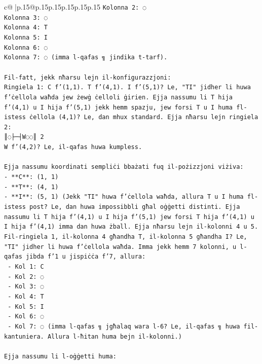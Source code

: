 \documentclass{article}
\begin{document}
{\begin{supertabular}{c@{$\;$}|p{.15\linewidth}@{}p{.15\linewidth}p{.15\linewidth}p{.15\linewidth}p{.15\linewidth}p{.15\linewidth}}
{{{\texttt{Kolonna 2: ◌} \\
\texttt{Kolonna 3: ◌} \\
\texttt{Kolonna 4: T} \\
\texttt{Kolonna 5: I} \\
\texttt{Kolonna 6: ◌} \\
\texttt{Kolonna 7: ◌ (imma l{-}qafas ╗ jindika t{-}tarf).} \\
\\ 
\texttt{Fil{-}fatt, jekk nħarsu lejn il{-}konfigurazzjoni:} \\
\texttt{Ringiela 1: C f'(1,1). T f'(4,1). I f'(5,1)? Le, "TI" jidher li huwa f'ċellola waħda jew żewġ ċelloli ġirien. Ejja nassumu li T hija f'(4,1) u I hija f'(5,1) jekk hemm spazju, jew forsi T u I huma fl{-}istess ċellola (4,1)? Le, dan mhux standard. Ejja nħarsu lejn ringiela 2:} \\
\texttt{║◌├─┤W◌◌║ 2} \\
\texttt{W f'(4,2)? Le, il{-}qafas huwa kumpless.} \\
\\ 
\texttt{Ejja nassumu koordinati sempliċi bbażati fuq il{-}pożizzjoni viżiva:} \\
\texttt{{-} **C**: (1, 1)} \\
\texttt{{-} **T**: (4, 1)} \\
\texttt{{-} **I**: (5, 1) (Jekk "TI" huwa f'ċellola waħda, allura T u I huma fl{-}istess post? Le, dan huwa impossibbli għal oġġetti distinti. Ejja nassumu li T hija f'(4,1) u I hija f'(5,1) jew forsi T hija f'(4,1) u I hija f'(4,1) imma dan huwa żball. Ejja nħarsu lejn il{-}kolonni 4 u 5. Fil{-}ringiela 1, il{-}kolonna 4 għandha T, il{-}kolonna 5 għandha I? Le, "TI" jidher li huwa f'ċellola waħda. Imma jekk hemm 7 kolonni, u l{-}qafas jibda f'1 u jispiċċa f'7, allura:} \\
\texttt{  {-} Kol 1: C} \\
\texttt{  {-} Kol 2: ◌} \\
\texttt{  {-} Kol 3: ◌} \\
\texttt{  {-} Kol 4: T} \\
\texttt{  {-} Kol 5: I} \\
\texttt{  {-} Kol 6: ◌} \\
\texttt{  {-} Kol 7: ◌ (imma l{-}qafas ╗ jgħalaq wara l{-}6? Le, il{-}qafas ╗ huwa fil{-}kantuniera. Allura l{-}ħitan huma bejn il{-}kolonni.)} \\
\\ 
\texttt{Ejja nassumu li l{-}oġġetti huma:} \\
}}}
\end{supertabular}}
\end{document}
